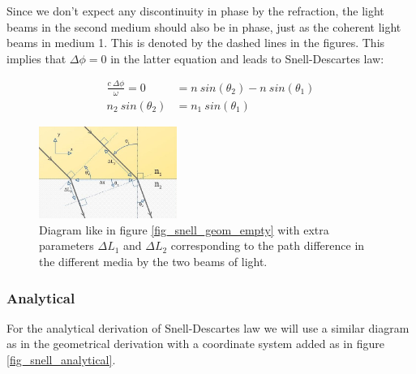 \documentclass{article}
\begin{document}
Since we don't expect any discontinuity in phase by the refraction, the light beams in the second medium should also be in phase, just as the coherent light beams in medium 1. This is denoted by the dashed lines in the figures. This implies that $\Delta \phi = 0$ in the latter equation and leads to Snell-Descartes law:

\begin{align*}
	\frac{c \: \Delta \phi}{\omega} = 0 &=  n \: sin(\theta_2) - n \: sin(\theta_1) \\
	 n_2 \: sin(\theta_2) &= n_1 \: sin(\theta_1)
\end{align*}


\begin{figure}[h!]
	\centering
	\includegraphics[width=0.4\textwidth]{afbeeldingen/snell_geom.jpg}
	\caption{Diagram like in figure \ref{fig_snell_geom_empty} with extra parameters $\Delta L_1$ and $\Delta L_2$ corresponding to the path difference in the different media by the two beams of light.}
	\label{fig_snell_geom}
\end{figure}

 \newpage
 
\subsubsection{Analytical}

For the analytical derivation of Snell-Descartes law we will use a similar diagram as in the geometrical derivation with a coordinate system added as in figure \ref{fig_snell_analytical}.
\end{document}
